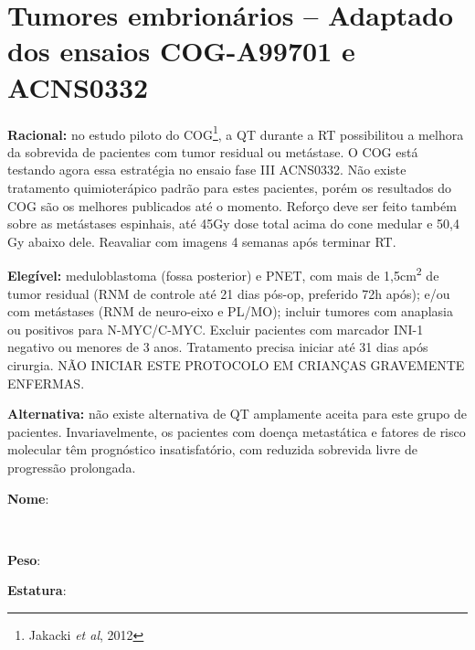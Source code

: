 \documentclass[11pt,a4paper,oldfontcommands]{memoir}
\def\entrywithlabel[#1]#2{\parbox{#1}{{\small #2:} \hrulefill}}
\begin{document}

\cleardoublepage

\section{Tumores embrionários -- Adaptado dos ensaios COG-A99701 e ACNS0332}
{\let\thefootnote\relax{}}
\textbf{Racional:} no estudo piloto do COG\footnote{Jakacki \textit{et al}, 2012}, a QT durante a RT possibilitou a melhora da sobrevida de pacientes com tumor residual ou metástase. O COG está testando agora essa estratégia no ensaio fase III ACNS0332. Não existe tratamento quimioterápico padrão para estes pacientes, porém os resultados do COG são os melhores publicados até o momento. Reforço deve ser feito também sobre as metástases espinhais, até 45Gy dose total acima do cone medular e 50,4 Gy abaixo dele. Reavaliar com imagens 4 semanas após terminar RT.

\textbf{Elegível:} meduloblastoma (fossa posterior) e PNET, com mais de 1,5cm\textsuperscript{2} de tumor residual (RNM de controle até 21 dias pós-op, preferido 72h após); e/ou com metástases (RNM de neuro-eixo e PL/MO); incluir tumores com anaplasia ou positivos para N-MYC/C-MYC. Excluir pacientes com marcador INI-1 negativo ou menores de 3 anos. Tratamento precisa iniciar até 31 dias após cirurgia. NÃO INICIAR ESTE PROTOCOLO EM CRIANÇAS GRAVEMENTE ENFERMAS.

\textbf{Alternativa:} não existe alternativa de QT amplamente aceita para este grupo de pacientes. Invariavelmente, os pacientes com doença metastática e fatores de risco molecular têm prognóstico insatisfatório, com reduzida sobrevida livre de progressão prolongada.
\\[0.4cm]
\entrywithlabel[1\hsize]{\textbf{Nome}}\hfill
\\[0.3cm]
\entrywithlabel[.45\hsize]{\textbf{Peso}}\hfill  \entrywithlabel[.45\hsize]{\textbf{Estatura}}
\end{document}
